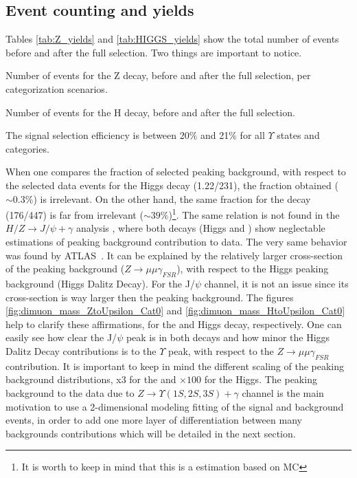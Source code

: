 \subsection{Event counting and yields}
\label{sec:yields}

Tables \ref{tab:Z_yields} and \ref{tab:HIGGS_yields} show the total number of events before and after the full selection. Two things are important to notice.

\begin{table}[ht]
\begin{center}

\caption{Number of events for the Z decay, before and after the full selection, per categorization scenarios.}
\label{tab:Z_yields}
\end{center}
\end{table}


\begin{table}[ht]
\begin{center}

\caption{Number of events for the H decay, before and after the full selection.}
\label{tab:HIGGS_yields}
\end{center}
\end{table}


The signal selection efficiency is between 20\% and 21\% for all $\Upsilon$ states and categories. 

When one compares the fraction of selected peaking background, with respect to the selected data events for the Higgs decay (1.22/231), the fraction obtained ($\sim0.3\%$) is irrelevant. On the other hand, the same fraction for the \Z decay (176/447) is far from irrelevant ($\sim39\%$)\footnote{It is worth to keep in mind that this is a estimation based on MC}. The same relation is not found in the $H/Z \rightarrow J/\psi + \gamma$ analysis \cite{papper_jpsi}, where both decays (Higgs and \Z) show neglectable estimations of peaking background contribution to data. 
The very same behavior was found by ATLAS~\cite{atlas_paper:PhysRevLett.114.121801}. It can be explained by the relatively larger cross-section of the \Z peaking background ($Z \rightarrow \mu\mu\gamma_{FSR}$), with respect to the Higgs peaking background (Higgs Dalitz Decay). For the J/$\psi$ channel, it is not an issue since its  cross-section is way larger then the peaking background. The figures \ref{fig:dimuon_mass_ZtoUpsilon_Cat0} and \ref{fig:dimuon_mass_HtoUpsilon_Cat0} help to clarify these affirmations, for the \Z and Higgs decay, respectively. 
One can easily see how clear the J/$\psi$ peak is in both decays and how minor the Higgs Dalitz Decay contributions is to the $\Upsilon$ peak, with respect to the $Z \rightarrow \mu\mu\gamma_{FSR}$ contribution. It is important to keep in mind the different scaling of the peaking background distributions, x3 for the \Z and $\times 100$ for the Higgs.
The peaking background to the data due to $Z \rightarrow \Upsilon(1S,2S,3S) + \gamma$ channel  is the main motivation to use a 2-dimensional modeling fitting of the signal and background events, in order to add one more layer of differentiation between many backgrounds contributions which will be detailed in the next section.


